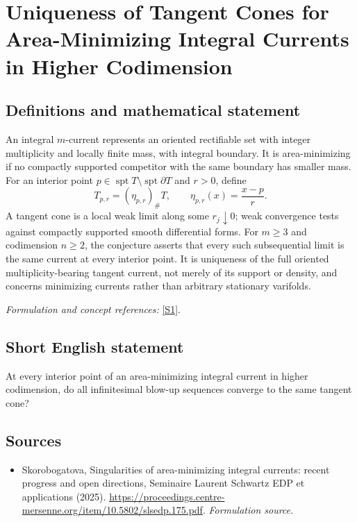 \documentclass[11pt]{article}
\begin{document}
\section*{\texorpdfstring{Uniqueness of Tangent Cones for Area-Minimizing Integral Currents in Higher Codimension}{Uniqueness of Tangent Cones for Area-Minimizing Integral Currents in Higher Codimension}}\label{statement}
\subsection{Definitions and mathematical statement}
An integral $m$-current represents an oriented rectifiable set with integer multiplicity and locally finite mass, with integral boundary. It is area-minimizing if no compactly supported competitor with the same boundary has smaller mass. For an interior point $p\in\operatorname{spt}T\setminus\operatorname{spt}\partial T$ and $r>0$, define
\[
 T_{p,r}=(\eta_{p,r})_\#T,
 \qquad\eta_{p,r}(x)=\frac{x-p}{r}.
\]
A tangent cone is a local weak limit along some $r_j\downarrow0$; weak convergence tests against compactly supported smooth differential forms. For $m\ge3$ and codimension $n\ge2$, the conjecture asserts that every such subsequential limit is the same current at every interior point. It is uniqueness of the full oriented multiplicity-bearing tangent current, not merely of its support or density, and concerns minimizing currents rather than arbitrary stationary varifolds.
\par\smallskip\textit{Formulation and concept references:} \href{https://proceedings.centre-mersenne.org/item/10.5802/slsedp.175.pdf}{[S1]}.

\subsection{Short English statement}
At every interior point of an area-minimizing integral current in higher codimension, do all infinitesimal blow-up sequences converge to the same tangent cone?
\subsection{Sources}
\begin{itemize}
\item[S1]Skorobogatova, Singularities of area-minimizing integral currents: recent progress and open directions, Seminaire Laurent Schwartz EDP et applications (2025).
\url{https://proceedings.centre-mersenne.org/item/10.5802/slsedp.175.pdf}.
\textit{Formulation source.}
\end{itemize}
\end{document}
